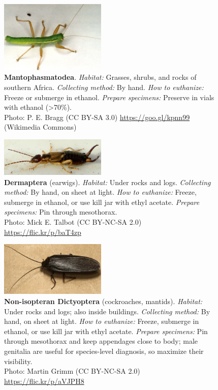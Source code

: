 \documentclass[letterpaper, 11pt]{article}
\begin{document}
\begin{figure}
  \caption{\textbf{Mantophasmatodea}. \textit{Habitat:} Grasses, shrubs, and rocks of southern Africa. \textit{Collecting method:} By hand. \textit{How to euthanize:} Freeze or submerge in ethanol. \textit{Prepare specimens:} Preserve in vials with ethanol (\textgreater70\%).\\ Photo: P. E. Bragg (CC BY-SA 3.0) \url{https://goo.gl/kpnn99} (Wikimedia Commons)}
  \includegraphics[width=0.45\textwidth]{Mantophasmatodea}
\end{figure}

\begin{figure}
  \caption{\textbf{Dermaptera} (earwigs). \textit{Habitat:} Under rocks and logs. \textit{Collecting method:} By hand, on sheet at light. \textit{How to euthanize:} Freeze, submerge in ethanol, or use kill jar with ethyl acetate. \textit{Prepare specimens:} Pin through mesothorax.\\ Photo: Mick E. Talbot (CC BY-NC-SA 2.0) \url{https://flic.kr/p/baT4zp}}
  \includegraphics[width=0.45\textwidth]{Dermaptera}
\end{figure}

\begin{figure}
  \caption{\textbf{Non-isopteran Dictyoptera} (cockroaches, mantids). \textit{Habitat:} Under rocks and logs; also inside buildings. \textit{Collecting method:} By hand, on sheet at light. \textit{How to euthanize:} Freeze, submerge in ethanol, or use kill jar with ethyl acetate. \textit{Prepare specimens:} Pin through mesothorax and keep appendages close to body; male genitalia are useful for species-level diagnosis, so maximize their visibility.\\Photo: Martin Grimm (CC BY-NC-SA 2.0) \url{https://flic.kr/p/aVJPH8}}
  \includegraphics[width=0.45\textwidth]{Blattodea}
\end{figure}
\end{document}
